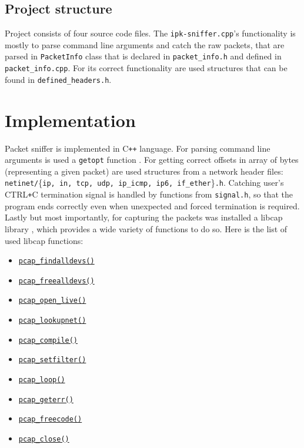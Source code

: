 \documentclass[a4paper,12pt]{article}
\begin{document}
    \subsection{Project structure}
    Project consists of four source code files. The \texttt{ipk-sniffer.cpp}'s functionality is mostly to parse command line arguments and catch the raw packets, that are parsed in \texttt{PacketInfo} class that is declared in \texttt{packet\_info.h} and defined in \texttt{packet\_info.cpp}. For its correct functionality are used structures that can be found in \texttt{defined\_headers.h}.
    
\section{Implementation}
    Packet sniffer is implemented in C\texttt{++} language. For parsing command line arguments is used a \texttt{getopt} function \cite{getopt}. For getting correct offsets in array of bytes (representing a given packet) are used structures from a network header files: \texttt{netinet/}\{\texttt{ip, in, tcp, udp, ip\_icmp, ip6, if\_ether}\}\texttt{.h}. Catching user's CTRL\texttt{+}C termination signal is handled by functions from \texttt{signal.h}, so that the program ends correctly even when unexpected and forced termination is required. Lastly but most importantly, for capturing the packets was installed a libcap library \cite{tcpdump}, which provides a wide variety of functions to do so. Here is the list of used libcap functions:
    \begin{multicols}{2}
    \begin{itemize}
        \item \href{https://man7.org/linux/man-pages/man3/pcap_findalldevs.3pcap.html}{\texttt{pcap\_findalldevs()}}
        \item \href{https://linux.die.net/man/3/pcap_freealldevs}{\texttt{pcap\_freealldevs()}}
        \item \href{https://linux.die.net/man/3/pcap_open_live}{\texttt{pcap\_open\_live()}}
        \item \href{https://linux.die.net/man/3/pcap_lookupnet}{\texttt{pcap\_lookupnet()}}
        \item \href{https://linux.die.net/man/3/pcap_compile}{\texttt{pcap\_compile()}}
    \end{itemize}
    \columnbreak
    \begin{itemize}
        \item \href{https://man7.org/linux/man-pages/man3/pcap_setfilter.3pcap.html}{\texttt{pcap\_setfilter()}}
        \item \href{https://linux.die.net/man/3/pcap_loop}{\texttt{pcap\_loop()}}
        \item \href{https://man7.org/linux/man-pages/man3/pcap_geterr.3pcap.html}{\texttt{pcap\_geterr()}}
        \item \href{https://man7.org/linux/man-pages/man3/pcap_freecode.3pcap.html}{\texttt{pcap\_freecode()}}
        \item \href{https://linux.die.net/man/3/pcap_close}{\texttt{pcap\_close()}}
    \end{itemize}
    \end{multicols}
    \newpage
\end{document}
